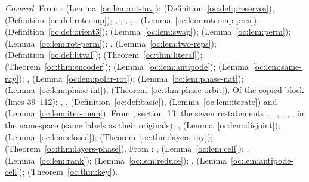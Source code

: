 \emph{Covered.} From : 
(Lemma~\ref{oc:lem:rot-inv});  (Definition~\ref{oc:def:preserves}); 
(Definition~\ref{oc:def:rotcomp}); , ,
, , ,
 (Lemma~\ref{oc:lem:rotcomp-pres}); 
(Definition~\ref{oc:def:orient3});  (Lemma~\ref{oc:lem:swap}); 
(Lemma~\ref{oc:lem:perm});  (Lemma~\ref{oc:lem:rot-perm});
,  (Lemma~\ref{oc:lem:two-reps}); 
(Definition~\ref{oc:def:litval});  (Theorem~\ref{oc:thm:literal});
 (Theorem~\ref{oc:thm:encoder}); 
(Lemma~\ref{oc:lem:antipode});  (Lemma~\ref{oc:lem:same-ray});
,  (Lemma~\ref{oc:lem:polar-rot}); 
(Lemma~\ref{oc:lem:phase-nat});  (Lemma~\ref{oc:lem:phase-int});
 (Theorem~\ref{oc:thm:phase-orbit}). Of the copied block (lines 39--112):
, ,  (Definition~\ref{oc:def:basic}), 
(Lemma~\ref{oc:lem:iterate}) and  (Lemma~\ref{oc:lem:iter-mem}).
From , section~13: the seven restatements ,
, , , ,
,  in the namespace
 (same labels as their originals); ,
 (Lemma~\ref{oc:lem:disjoint}); 
(Lemma~\ref{oc:lem:closed});  (Theorem~\ref{oc:thm:layers-ray});
 (Theorem~\ref{oc:thm:layers-phase}).
From : ,  (Lemma~\ref{oc:lem:cell});
,  (Lemma~\ref{oc:lem:rank});
 (Lemma~\ref{oc:lem:reduce}); , 
(Lemma~\ref{oc:lem:antipode-cell});  (Theorem~\ref{oc:thm:key}).

